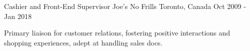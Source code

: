 \begin{cventries}
       \cventry
    {Cashier and Front-End Supervisor}
    {Joe's No Frills}
    {Toronto, Canada}
    {Oct 2009 - Jan 2018}
    {
      \begin{cvitems}
        \item {Primary liaison for customer relations, fostering positive interactions and shopping experiences, adept at handling sales docs.}
      \end{cvitems}
    }
\end{cventries}
